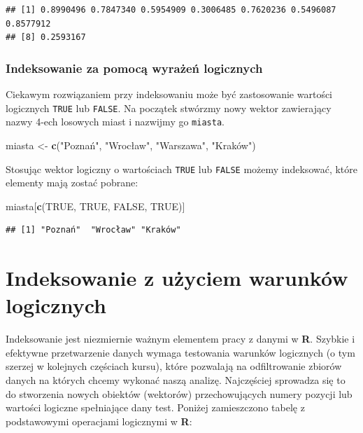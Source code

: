 \documentclass[]{book}
\newenvironment{Shaded}{\begin{snugshade}}{\end{snugshade}}
\newcommand{\KeywordTok}[1]{\textcolor[rgb]{0.13,0.29,0.53}{\textbf{#1}}}
\newcommand{\StringTok}[1]{\textcolor[rgb]{0.31,0.60,0.02}{#1}}
\newcommand{\OtherTok}[1]{\textcolor[rgb]{0.56,0.35,0.01}{#1}}
\newcommand{\NormalTok}[1]{#1}
\theoremstyle{definition}
\theoremstyle{definition}
\theoremstyle{definition}
\theoremstyle{remark}
\begin{document}
\begin{verbatim}
## [1] 0.8990496 0.7847340 0.5954909 0.3006485 0.7620236 0.5496087 0.8577912
## [8] 0.2593167
\end{verbatim}

\subsubsection{Indeksowanie za pomocą wyrażeń
logicznych}\label{indeksowanie-za-pomoca-wyrazen-logicznych}

Ciekawym rozwiązaniem przy indeksowaniu może być zastosowanie wartości
logicznych \texttt{TRUE} lub \texttt{FALSE}. Na początek stwórzmy nowy
wektor zawierający nazwy 4-ech losowych miast i nazwijmy go
\texttt{miasta}.

\begin{Shaded}
\begin{Highlighting}[]
\NormalTok{miasta <-}\StringTok{ }\KeywordTok{c}\NormalTok{(}\StringTok{"Poznań"}\NormalTok{, }\StringTok{"Wrocław"}\NormalTok{, }\StringTok{"Warszawa"}\NormalTok{, }\StringTok{"Kraków")}
\end{Highlighting}
\end{Shaded}

Stosując wektor logiczny o wartościach \texttt{TRUE} lub \texttt{FALSE}
możemy indeksować, które elementy mają zostać pobrane:

\begin{Shaded}
\begin{Highlighting}[]
\NormalTok{miasta[}\KeywordTok{c}\NormalTok{(}\OtherTok{TRUE}\NormalTok{, }\OtherTok{TRUE}\NormalTok{, }\OtherTok{FALSE}\NormalTok{, }\OtherTok{TRUE}\NormalTok{)]}
\end{Highlighting}
\end{Shaded}

\begin{verbatim}
## [1] "Poznań"  "Wrocław" "Kraków"
\end{verbatim}

\section{Indeksowanie z użyciem warunków
logicznych}\label{indeksowanie-z-uzyciem-warunkow-logicznych}

Indeksowanie jest niezmiernie ważnym elementem pracy z danymi w
\textbf{R}. Szybkie i efektywne przetwarzenie danych wymaga testowania
warunków logicznych (o tym szerzej w kolejnych częściach kursu), które
pozwalają na odfiltrowanie zbiorów danych na których chcemy wykonać
naszą analizę. Najczęściej sprowadza się to do stworzenia nowych
obiektów (wektorów) przechowujących numery pozycji lub wartości logiczne
spełniające dany test. Poniżej zamieszczono tabelę z podstawowymi
operacjami logicznymi w \textbf{R}:
\end{document}

